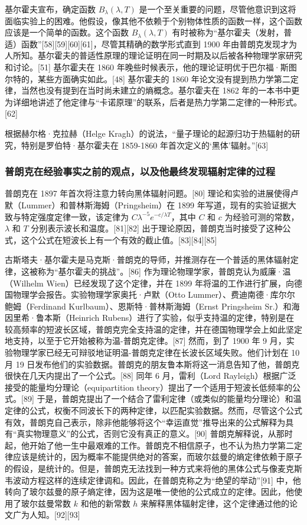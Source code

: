 基尔霍夫宣布，确定函数 \( B_\lambda (\lambda, T) \) 是一个至关重要的问题，尽管他意识到这将面临实验上的困难。他假设，像其他不依赖于个别物体性质的函数一样，这个函数应该是一个简单的函数。这个函数 \( B_\lambda (\lambda, T) \) 有时被称为“基尔霍夫（发射，普适）函数”[58][59][60][61]，尽管其精确的数学形式直到 1900 年由普朗克发现才为人所知。基尔霍夫的普适性原理的理论证明在同一时期及以后被各种物理学家研究和讨论。[51] 基尔霍夫在 1860 年晚些时候表示，他的理论证明优于巴尔福·斯图尔特的，某些方面确实如此。[48] 基尔霍夫的 1860 年论文没有提到热力学第二定律，当然也没有提到在当时尚未建立的熵概念。基尔霍夫在 1862 年的一本书中更为详细地讲述了他定律与“卡诺原理”的联系，后者是热力学第二定律的一种形式。[62]

根据赫尔格·克拉赫（Helge Kragh）的说法，“量子理论的起源归功于热辐射的研究，特别是罗伯特·基尔霍夫在 1859-1860 年首次定义的‘黑体’辐射。”[63]
\subsubsection{普朗克在经验事实之前的观点，以及他最终发现辐射定律的过程}
普朗克在 1897 年首次将注意力转向黑体辐射问题。[80] 理论和实验的进展使得卢默（Lummer）和普林斯海姆（Pringsheim）在 1899 年写道，现有的实验证据大致与特定强度定律一致，该定律为 \( C\lambda^{-5} e^{-c/\lambda T} \)，其中 \( C \) 和 \( c \) 为经验可测的常数，\( \lambda \) 和 \( T \) 分别表示波长和温度。[81][82] 出于理论原因，普朗克当时接受了这种公式，这个公式在短波长上有一个有效的截止值。[83][84][85]

古斯塔夫·基尔霍夫是马克斯·普朗克的导师，并推测存在一个普适的黑体辐射定律，这被称为“基尔霍夫的挑战”。[86] 作为理论物理学家，普朗克认为威廉·温（Wilhelm Wien）已经发现了这个定律，并在 1899 年将温的工作进行扩展，向德国物理学会报告。实验物理学家奥托·卢默（Otto Lummer）、费迪南德·库尔尔鲍姆（Ferdinand Kurlbaum）、恩斯特·普林斯海姆（Ernst Pringsheim Sr.）和海因里希·鲁本斯（Heinrich Rubens）进行了实验，似乎支持温的定律，特别是在较高频率的短波长区域，普朗克完全支持温的定律，并在德国物理学会上如此坚定地支持，以至于它开始被称为温-普朗克定律。[87] 然而，到了 1900 年 9 月，实验物理学家已经无可辩驳地证明温-普朗克定律在长波长区域失败。他们计划在 10 月 19 日发布他们的实验数据。普朗克的朋友鲁本斯将这一消息告知了他，普朗克很快在几天内提出了一个公式。[88] 同年 6 月，雷利（Lord Rayleigh）根据广泛接受的能量均分理论（equipartition theory）提出了一个适用于短波长低频率的公式。[89] 于是，普朗克提出了一个结合了雷利定律（或类似的能量均分理论）和温定律的公式，权衡不同波长下的两种定律，以匹配实验数据。然而，尽管这个公式有效，普朗克自己表示，除非他能够将这个“幸运直觉”推导出来的公式解释为具有“真实物理意义”的公式，否则它没有真正的意义。[90] 普朗克解释说，从那时起，他开始了他一生中最艰难的工作。普朗克不相信原子，也不认为热力学第二定律应该是统计的，因为概率不能提供绝对的答案，而玻尔兹曼的熵定律依赖于原子的假设，是统计的。但是，普朗克无法找到一种方式来将他的黑体公式与像麦克斯韦波动方程这样的连续定律调和。因此，在普朗克称之为“绝望的举动”[91] 中，他转向了玻尔兹曼的原子熵定律，因为这是唯一使他的公式成立的定律。因此，他使用了玻尔兹曼常数 \( k \) 和他的新常数 \( h \) 来解释黑体辐射定律，这个定律通过他的论文广为人知。[92][93]
